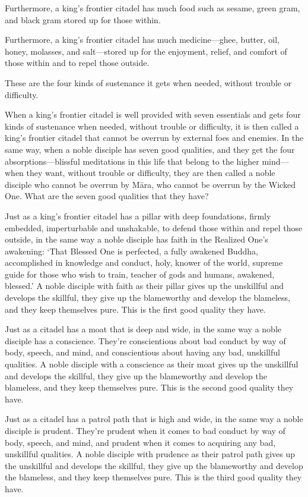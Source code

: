 \documentclass[12pt,openany]{book}%
\begin{document}
Furthermore, a king’s frontier citadel has much food such as sesame, green gram, and black gram stored up for those within. 

Furthermore, a king’s frontier citadel has much medicine—ghee, butter, oil, honey, molasses, and salt—stored up for the enjoyment, relief, and comfort of those within and to repel those outside. 

These are the four kinds of sustenance it gets when needed, without trouble or difficulty. 

When a king’s frontier citadel is well provided with seven essentials and gets four kinds of sustenance when needed, without trouble or difficulty, it is then called a king’s frontier citadel that cannot be overrun by external foes and enemies. In the same way, when a noble disciple has seven good qualities, and they get the four absorptions—blissful meditations in this life that belong to the higher mind—when they want, without trouble or difficulty, they are then called a noble disciple who cannot be overrun by \textsanskrit{Māra}, who cannot be overrun by the Wicked One. What are the seven good qualities that they have? 

Just as a king’s frontier citadel has a pillar with deep foundations, firmly embedded, imperturbable and unshakable, to defend those within and repel those outside, in the same way a noble disciple has faith in the Realized One’s awakening: ‘That Blessed One is perfected, a fully awakened Buddha, accomplished in knowledge and conduct, holy, knower of the world, supreme guide for those who wish to train, teacher of gods and humans, awakened, blessed.’ A noble disciple with faith as their pillar gives up the unskillful and develops the skillful, they give up the blameworthy and develop the blameless, and they keep themselves pure. This is the first good quality they have. 

Just as a citadel has a moat that is deep and wide, in the same way a noble disciple has a conscience. They’re conscientious about bad conduct by way of body, speech, and mind, and conscientious about having any bad, unskillful qualities. A noble disciple with a conscience as their moat gives up the unskillful and develops the skillful, they give up the blameworthy and develop the blameless, and they keep themselves pure. This is the second good quality they have. 

Just as a citadel has a patrol path that is high and wide, in the same way a noble disciple is prudent. They’re prudent when it comes to bad conduct by way of body, speech, and mind, and prudent when it comes to acquiring any bad, unskillful qualities. A noble disciple with prudence as their patrol path gives up the unskillful and develops the skillful, they give up the blameworthy and develop the blameless, and they keep themselves pure. This is the third good quality they have. 
\end{document}
